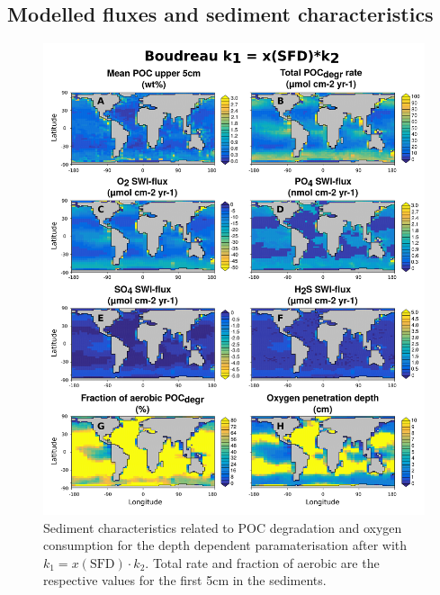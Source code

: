 \documentclass[gmd, manuscript]{copernicus}
\begin{document}
\subsection{Modelled fluxes and sediment characteristics}
\begin{figure}[htbp]
\begin{center}
	\includegraphics[width=1.0\textwidth]{figures/OMEN-GENIE-Exp/0_2908_Boudreau_Depth_SED_PROPS_AND_FLUXES_1009_LINES.pdf}
	\caption{Sediment characteristics related to POC degradation and oxygen consumption for the depth dependent paramaterisation after \citet{boudreau1997diagenetic} with $k_1 = x(\mathrm{SFD}) \cdot k_2$.
	Total  rate and fraction of aerobic  are the respective values for the first 5cm in the sediments. 
	}\label{fig:OMEN_GENIE_best_fit_invariant}
\end{center}
\end{figure}
\end{document}
